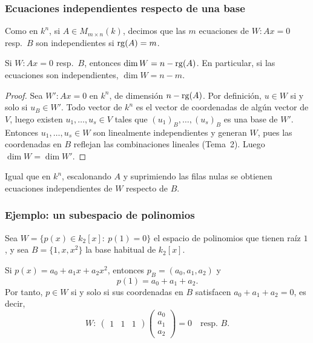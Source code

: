 \begin{frame}
    \frametitle{Ecuaciones independientes respecto de una base}

    Como en $k^n$, si $A\in M_{m\times n}(k)$, decimos que las $m$
    ecuaciones de $W\colon Ax=0$ resp.\ $B$ son \alert{independientes}
    si $\operatorname{rg}(A)=m$.

    \begin{proposition}
        Si $W\colon Ax=0$ resp.\ $B$, entonces $\dim W=n-\operatorname{rg}(A)$.
        En particular, si las ecuaciones son independientes,
        $\dim W=n-m$.
    \end{proposition}

    \begin{proof}
        Sea $W'\colon Ax=0$ en $k^n$, de dimensión $n-\operatorname{rg}(A)$. Por
        definición, $u\in W$ si y solo si $u_B\in W'$. Todo vector de
        $k^n$ es el vector de coordenadas de algún vector de $V$, luego
        existen $u_1,\ldots,u_s\in V$ tales que $(u_1)_B,\ldots,(u_s)_B$ es
        una base de $W'$. Entonces $u_1,\ldots,u_s\in W$ son linealmente
        independientes y generan $W$, pues las coordenadas en $B$
        reflejan las combinaciones lineales (Tema~2). Luego
        $\dim W=\dim W'$.
    \end{proof}

    \medskip

    Igual que en $k^n$, escalonando $A$ y suprimiendo las filas nulas
    se obtienen ecuaciones independientes de $W$ respecto de $B$.
\end{frame}

\begin{frame}
    \frametitle{Ejemplo: un subespacio de polinomios}

    \begin{example}
        Sea $W=\{p(x)\in k_2[x]:\ p(1)=0\}$ el espacio de polinomios que tienen raíz $1$, y sea $B=\{1,x,x^2\}$ la base habitual de $k_2[x]$.
    \end{example}

    \medskip

    Si $p(x)=a_0+a_1x+a_2x^2$, entonces $p_B=(a_0,a_1,a_2)$ y
    \[
        p(1)=a_0+a_1+a_2.
    \]
    Por tanto, $p\in W$ si y solo si sus coordenadas en $B$ satisfacen
    $a_0+a_1+a_2=0$, es decir,
    \[
        W\colon\
        \begin{pmatrix}1&1&1\end{pmatrix}
        \begin{pmatrix}a_0\\a_1\\a_2\end{pmatrix}=0
        \quad\text{resp.\ }B.
    \]
\end{frame}

